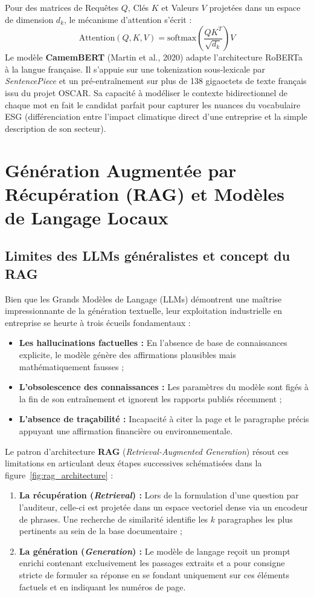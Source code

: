 \documentclass[12pt,a4paper]{report}
\begin{document}
Pour des matrices de Requêtes $Q$, Clés $K$ et Valeurs $V$ projetées dans un espace de dimension $d_k$, le mécanisme d'attention s'écrit :
\begin{equation}
    \text{Attention}(Q, K, V) = \text{softmax}\left(\frac{Q K^T}{\sqrt{d_k}}\right) V
\end{equation}
Le modèle \textbf{CamemBERT} (Martin et al., 2020) adapte l'architecture RoBERTa à la langue française. Il s'appuie sur une tokenization sous-lexicale par \textit{SentencePiece} et un pré-entraînement sur plus de 138 gigaoctets de texte français issu du projet OSCAR. Sa capacité à modéliser le contexte bidirectionnel de chaque mot en fait le candidat parfait pour capturer les nuances du vocabulaire ESG (différenciation entre l'impact climatique direct d'une entreprise et la simple description de son secteur).

\section{Génération Augmentée par Récupération (RAG) et Modèles de Langage Locaux}

\subsection{Limites des LLMs généralistes et concept du RAG}
Bien que les Grands Modèles de Langage (LLMs) démontrent une maîtrise impressionnante de la génération textuelle, leur exploitation industrielle en entreprise se heurte à trois écueils fondamentaux :
\begin{itemize}
    \item \textbf{Les hallucinations factuelles :} En l'absence de base de connaissances explicite, le modèle génère des affirmations plausibles mais mathématiquement fausses ;
    \item \textbf{L'obsolescence des connaissances :} Les paramètres du modèle sont figés à la fin de son entraînement et ignorent les rapports publiés récemment ;
    \item \textbf{L'absence de traçabilité :} Incapacité à citer la page et le paragraphe précis appuyant une affirmation financière ou environnementale.
\end{itemize}

Le patron d'architecture \textbf{RAG} (\textit{Retrieval-Augmented Generation}) résout ces limitations en articulant deux étapes successives schématisées dans la figure~\ref{fig:rag_architecture} :
\begin{enumerate}
    \item \textbf{La récupération (\textit{Retrieval}) :} Lors de la formulation d'une question par l'auditeur, celle-ci est projetée dans un espace vectoriel dense via un encodeur de phrases. Une recherche de similarité identifie les $k$ paragraphes les plus pertinents au sein de la base documentaire ;
    \item \textbf{La génération (\textit{Generation}) :} Le modèle de langage reçoit un prompt enrichi contenant exclusivement les passages extraits et a pour consigne stricte de formuler sa réponse en se fondant uniquement sur ces éléments factuels et en indiquant les numéros de page.
\end{enumerate}
\end{document}
